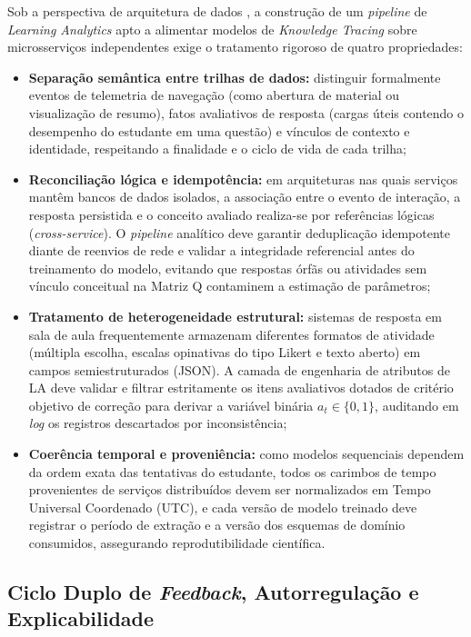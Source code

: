 Sob a perspectiva de arquitetura de dados \cite{kleppmann_designing_2017}, a construção de um \textit{pipeline} de \textit{Learning Analytics} apto a alimentar modelos de \textit{Knowledge Tracing} sobre microsserviços independentes exige o tratamento rigoroso de quatro propriedades:
\begin{itemize}
    \item \textbf{Separação semântica entre trilhas de dados:} distinguir formalmente eventos de telemetria de navegação (como abertura de material ou visualização de resumo), fatos avaliativos de resposta (cargas úteis contendo o desempenho do estudante em uma questão) e vínculos de contexto e identidade, respeitando a finalidade e o ciclo de vida de cada trilha;
    \item \textbf{Reconciliação lógica e idempotência:} em arquiteturas nas quais serviços mantêm bancos de dados isolados, a associação entre o evento de interação, a resposta persistida e o conceito avaliado realiza-se por referências lógicas (\textit{cross-service}). O \textit{pipeline} analítico deve garantir deduplicação idempotente diante de reenvios de rede e validar a integridade referencial antes do treinamento do modelo, evitando que respostas órfãs ou atividades sem vínculo conceitual na Matriz Q contaminem a estimação de parâmetros;
    \item \textbf{Tratamento de heterogeneidade estrutural:} sistemas de resposta em sala de aula frequentemente armazenam diferentes formatos de atividade (múltipla escolha, escalas opinativas do tipo Likert e texto aberto) em campos semiestruturados (JSON). A camada de engenharia de atributos de LA deve validar e filtrar estritamente os itens avaliativos dotados de critério objetivo de correção para derivar a variável binária $a_t \in \{0, 1\}$, auditando em \textit{log} os registros descartados por inconsistência;
    \item \textbf{Coerência temporal e proveniência:} como modelos sequenciais dependem da ordem exata das tentativas do estudante, todos os carimbos de tempo provenientes de serviços distribuídos devem ser normalizados em Tempo Universal Coordenado (UTC), e cada versão de modelo treinado deve registrar o período de extração e a versão dos esquemas de domínio consumidos, assegurando reprodutibilidade científica.
\end{itemize}

\subsection{Ciclo Duplo de \textit{Feedback}, Autorregulação e Explicabilidade}
\label{subsec:ciclo-duplo-la}

